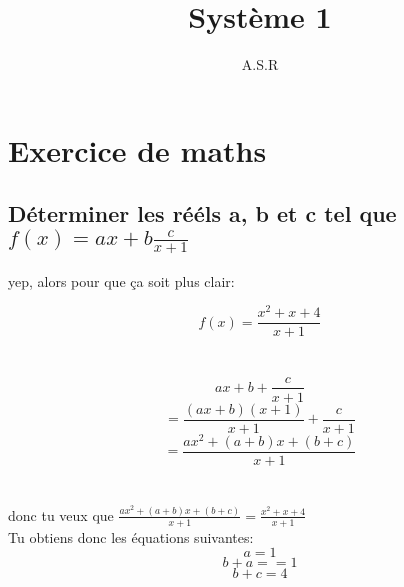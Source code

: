 \documentclass{report}
\title{Système 1}
\author{A.S.R}
\begin{document}
	\section{Exercice de maths}
		\subsection{Déterminer les rééls a, b et c tel que $f(x)=ax+b\frac{c}{x+1}$}
			yep, alors pour que ça soit plus clair:

			$$f(x)=\frac{x^{2} + x + 4}{x + 1}$$\\ \\
			
			$$ax+b+\frac{c}{x+1}$$
			$$=\frac{(ax + b)(x + 1)}{x + 1} + \frac{c}{x + 1}$$
			$$=\frac{ax^2 + (a + b)x + (b + c)}{x + 1}$$\\ \\
			
			donc tu veux que $\frac{ax^{2} + (a+b)x + (b+c)}{x + 1} = \frac{x^{2} + x + 4}{x + 1}$\\
			Tu obtiens donc les équations suivantes: 
			$$a = 1$$
			$$b + a == 1$$
			$$b+c = 4$$
	
			
			
\end{document}
